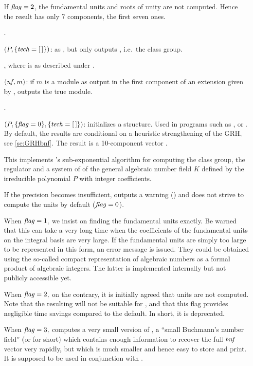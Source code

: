 If $\hbox{\it f\kern0pt lag\/}=2$, the fundamental units and roots of unity are not computed.
Hence the result has only 7 components, the first seven ones.

.

$(P,\{\hbox{\it tech\/}=[\,]\})$: as , but only
outputs , i.e.~the class group.

, where 
is as described under .

$(\hbox{\it nf\/},m)$: if $m$ is a module as output in the
first component of an extension given by , outputs the
true module.

.

$(P,\{\hbox{\it f\kern0pt lag\/}=0\},\{\hbox{\it tech\/}=[\,]\})$: initializes a
 structure. Used in programs such as ,
 or . By default, the results are conditional
on a heuristic strengthening of the GRH, see \ref{se:GRHbnf}. The result is a
10-component vector .

This implements 's sub-exponential algorithm for computing the
class group, the regulator and a system of  of the
general algebraic number field $K$ defined by the irreducible polynomial $P$
with integer coefficients.

If the precision becomes insufficient,  outputs a warning
() and does not strive to compute
the units by default ($\hbox{\it f\kern0pt lag\/}=0$).

   When $\hbox{\it f\kern0pt lag\/}=1$, we insist on finding the fundamental units exactly. Be
warned that this can take a very long time when the coefficients of the
fundamental units on the integral basis are very large. If the fundamental
units are simply too large to be represented in this form, an error message
is issued. They could be obtained using the so-called compact representation
of algebraic numbers as a formal product of algebraic integers. The latter is
implemented internally but not publicly accessible yet.

   When $\hbox{\it f\kern0pt lag\/}=2$, on the contrary, it is initially agreed that units are not
computed. Note that the resulting  will not be suitable for
, and that this flag provides negligible time savings
compared to the default. In short, it is deprecated.

   When $\hbox{\it f\kern0pt lag\/}=3$, computes a very small version of , a ``small
Buchmann's number field'' (or  for short) which contains enough
information to recover the full $\hbox{\it bnf\/}$ vector very rapidly, but which is
much smaller and hence easy to store and print. It is supposed to be used in
conjunction with .

